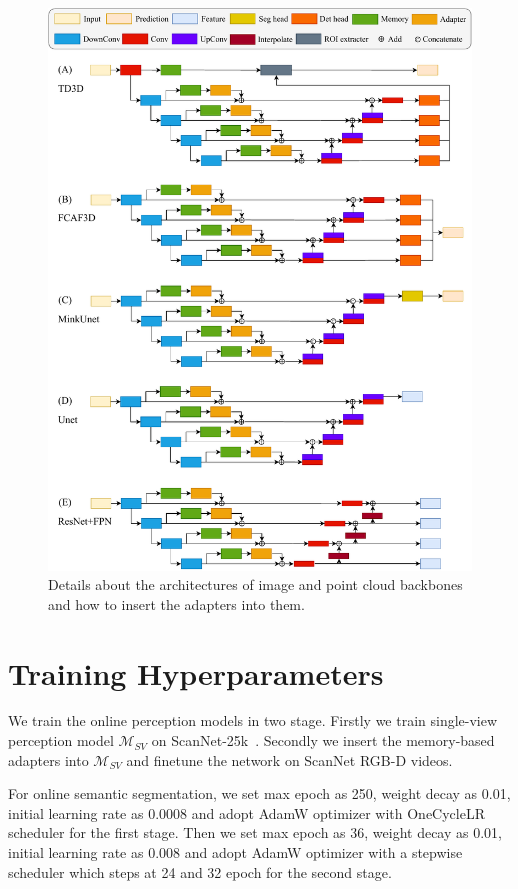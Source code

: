 \begin{figure}[t]
    \centering
    \includegraphics[width=1.0\linewidth]{figures/supp.pdf}
    \caption{Details about the architectures of image and point cloud backbones and how to insert the adapters into them.}
    \label{arch}
\end{figure}


\section{Training Hyperparameters}\label{hyperparameters}
We train the online perception models in two stage. Firstly we train single-view perception model $\mathcal{M}_{SV}$ on ScanNet-25k~\cite{dai2017scannet}. 
Secondly we insert the memory-based adapters into $\mathcal{M}_{SV}$ and finetune the network on ScanNet RGB-D videos.

For online semantic segmentation, we set max epoch as 250, weight decay as 0.01, initial learning rate as 0.0008 and adopt AdamW optimizer with OneCycleLR scheduler for the first stage. Then we set max epoch as 36, weight decay as 0.01, initial learning rate as 0.008 and adopt AdamW optimizer with a stepwise scheduler which steps at 24 and 32 epoch for the second stage.

